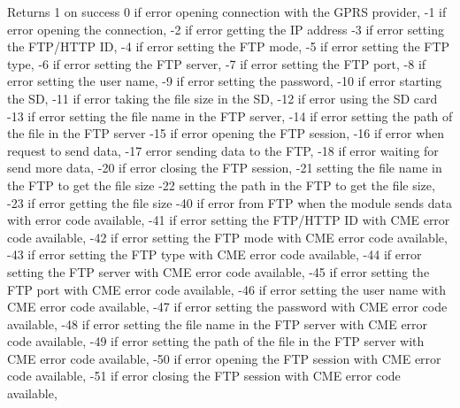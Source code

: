 \begin{DoxyReturn}{Returns}
\textquotesingle{}1\textquotesingle{} on success \textquotesingle{}0\textquotesingle{} if error opening connection with the G\+P\+RS provider, \textquotesingle{}-\/1\textquotesingle{} if error opening the connection, \textquotesingle{}-\/2\textquotesingle{} if error getting the IP address \textquotesingle{}-\/3\textquotesingle{} if error setting the F\+T\+P/\+H\+T\+TP ID, \textquotesingle{}-\/4\textquotesingle{} if error setting the F\+TP mode, \textquotesingle{}-\/5\textquotesingle{} if error setting the F\+TP type, \textquotesingle{}-\/6\textquotesingle{} if error setting the F\+TP server, \textquotesingle{}-\/7\textquotesingle{} if error setting the F\+TP port, \textquotesingle{}-\/8\textquotesingle{} if error setting the user name, \textquotesingle{}-\/9\textquotesingle{} if error setting the password, \textquotesingle{}-\/10\textquotesingle{} if error starting the SD, \textquotesingle{}-\/11\textquotesingle{} if error taking the file size in the SD, \textquotesingle{}-\/12\textquotesingle{} if error using the SD card \textquotesingle{}-\/13\textquotesingle{} if error setting the file name in the F\+TP server, \textquotesingle{}-\/14\textquotesingle{} if error setting the path of the file in the F\+TP server \textquotesingle{}-\/15\textquotesingle{} if error opening the F\+TP session, \textquotesingle{}-\/16\textquotesingle{} if error when request to send data, \textquotesingle{}-\/17\textquotesingle{} error sending data to the F\+TP, \textquotesingle{}-\/18\textquotesingle{} if error waiting for send more data, \textquotesingle{}-\/20\textquotesingle{} if error closing the F\+TP session, \textquotesingle{}-\/21\textquotesingle{} setting the file name in the F\+TP to get the file size \textquotesingle{}-\/22\textquotesingle{} setting the path in the F\+TP to get the file size, \textquotesingle{}-\/23\textquotesingle{} if error getting the file size \textquotesingle{}-\/40\textquotesingle{} if error from F\+TP when the module sends data with error code available, \textquotesingle{}-\/41\textquotesingle{} if error setting the F\+T\+P/\+H\+T\+TP ID with C\+ME error code available, \textquotesingle{}-\/42\textquotesingle{} if error setting the F\+TP mode with C\+ME error code available, \textquotesingle{}-\/43\textquotesingle{} if error setting the F\+TP type with C\+ME error code available, \textquotesingle{}-\/44\textquotesingle{} if error setting the F\+TP server with C\+ME error code available, \textquotesingle{}-\/45\textquotesingle{} if error setting the F\+TP port with C\+ME error code available, \textquotesingle{}-\/46\textquotesingle{} if error setting the user name with C\+ME error code available, \textquotesingle{}-\/47\textquotesingle{} if error setting the password with C\+ME error code available, \textquotesingle{}-\/48\textquotesingle{} if error setting the file name in the F\+TP server with C\+ME error code available, \textquotesingle{}-\/49\textquotesingle{} if error setting the path of the file in the F\+TP server with C\+ME error code available, \textquotesingle{}-\/50\textquotesingle{} if error opening the F\+TP session with C\+ME error code available, \textquotesingle{}-\/51\textquotesingle{} if error closing the F\+TP session with C\+ME error code available, 
\end{DoxyReturn}
